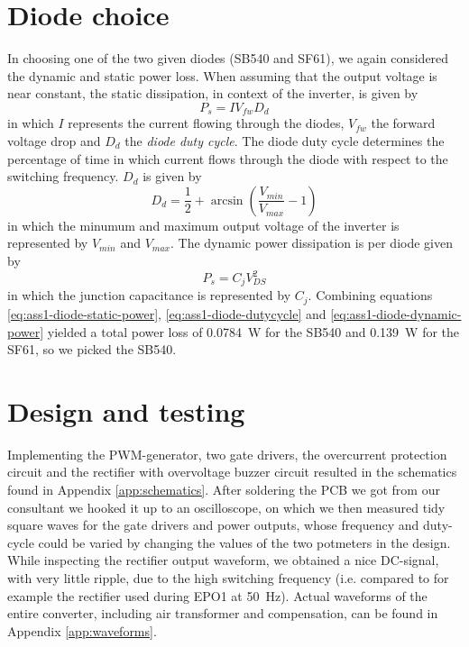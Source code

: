 \documentclass[11pt,titlepage]{report}
\begin{document}
\section{Diode choice}
In choosing one of the two given diodes (SB540 and SF61), we again considered the dynamic and static power loss. When assuming that the output voltage is near constant, the static dissipation, in context of the inverter, is given by
\begin{equation}
\label{eq:ass1-diode-static-power}
	P_s = I V_{fw} D_{d}
\end{equation}
in which $I$ represents the current flowing through the diodes, $V_{fw}$ the forward voltage drop and $D_{d}$ the \textit{diode duty cycle}. The diode duty cycle determines the percentage of time in which current flows through the diode with respect to the switching frequency. $D_{d}$ is given by
\begin{equation}
\label{eq:ass1-diode-dutycycle}
	D_d = \frac{1}{2}+\arcsin{ \left( \frac{V_{min}}{V_{max}}-1 \right) }
\end{equation}
in which the minumum and maximum output voltage of the inverter is represented by $V_{min}$ and $V_{max}$. The dynamic power dissipation is per diode given by
\begin{equation}
\label{eq:ass1-diode-dynamic-power}
	P_s = C_j V_{DS}^2
\end{equation}
in which the junction capacitance is represented by $C_j$. Combining equations \ref{eq:ass1-diode-static-power}, \ref{eq:ass1-diode-dutycycle} and \ref{eq:ass1-diode-dynamic-power} yielded a total power loss of \SI{0.0784}{W} for the SB540 and \SI{0.139}{W} for the SF61, so we picked the SB540. \cite{SB540-datasheet,SF61-datasheet}


\section{Design and testing}
Implementing the PWM-generator, two gate drivers, the overcurrent protection circuit and the rectifier with overvoltage buzzer circuit resulted in the schematics found in Appendix \ref{app:schematics}. After soldering the PCB we got from our consultant we hooked it up to an oscilloscope, on which we then measured tidy square waves for the gate drivers and power outputs, whose frequency and duty-cycle could be varied by changing the values of the two potmeters in the design. While inspecting the rectifier output waveform, we obtained a nice DC-signal, with very little ripple, due to the high switching frequency (i.e. compared to for example the rectifier used during EPO1 at \SI{50}{Hz}).
Actual waveforms of the entire converter, including air transformer and compensation, can be found in Appendix \ref{app:waveforms}.
\end{document}
